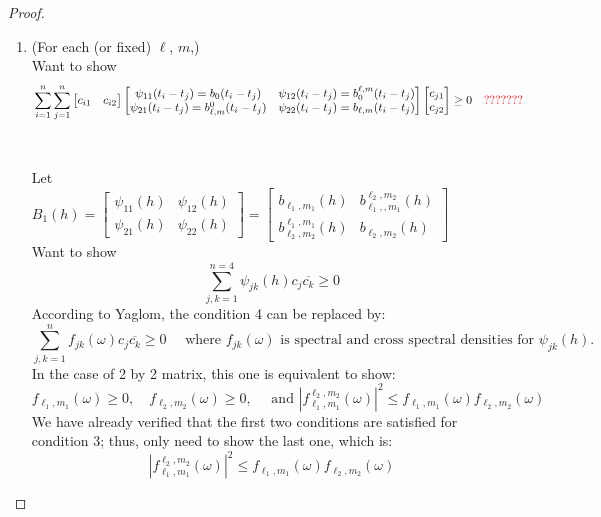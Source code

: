 \documentclass[11pt]{article}
\begin{document}
\begin{itemize}
\begin{proof}
\begin{enumerate}
\item
{\color{red}(For each (or fixed) $\ell$, $m$,)}\\
Want to show\\
\begin{align*}
&\sum_{i=1}^n \sum_{j=1}^n 
\begin{bmatrix}
c_{i1} & c_{i2}
\end{bmatrix}
\begin{bmatrix}
\psi_{11}(t_i-t_j) = b_0(t_i-t_j) & \psi_{12}(t_i-t_j) = b_0^{\ell,m}(t_i-t_j)\\ 
\psi_{21}(t_i-t_j) = b_{\ell,m}^0(t_i-t_j) & \psi_{22}(t_i-t_j) = b_{\ell,m}(t_i-t_j)
\end{bmatrix}
\begin{bmatrix}
c_{j1}\\
c_{j2} 
\end{bmatrix}
\ge0 \quad{\color{red}???????}
\end{align*}
\\
\\
Let\\
$B_1(h)= 
\begin{bmatrix}
\psi_{11}(h) & \psi_{12}(h) \\ 
\psi_{21}(h) & \psi_{22}(h) 
\end{bmatrix}
=
\begin{bmatrix}
b_{\ell_1,m_1}(h) & b_{\ell_1,,m_1}^{\ell_2,m_2}(h) \\ 
b_{\ell_2,m_2}^{\ell_1,m_1}(h) & b_{\ell_2,m_2}(h) 
\end{bmatrix}$
\\
Want to show\\
$$\sum_{j,k=1}^{n=4} \psi_{jk}(h) c_j \overline{c_k} \ge 0$$
According to Yaglom, the condition 4 can be replaced by:\\
$$\sum_{j,k=1}^n f_{jk}(\omega) c_j \overline{c_k} \ge 0 \quad \text{ where } f_{jk}(\omega) \text{ is spectral and cross spectral densities for } \psi_{jk}(h).$$
In the case of 2 by 2 matrix, this one is equivalent to show:\\
$$f_{\ell_1,m_1}(\omega) \ge 0, \quad f_{\ell_2,m_2}(\omega) \ge 0, \quad \text{ and } |f_{\ell_1,m_1}^{\ell_2, m_2}(\omega)|^2 \le f_{\ell_1,m_1}(\omega) f_{\ell_2,m_2}(\omega)$$
We have already verified that the first two conditions are satisfied for condition 3; thus, only need to show the last one, which is:\\
$$|f_{\ell_1,m_1}^{\ell_2, m_2}(\omega)|^2 \le f_{\ell_1,m_1}(\omega) f_{\ell_2,m_2}(\omega)$$


\end{enumerate}
\end{proof}
\end{itemize}
\end{document}
